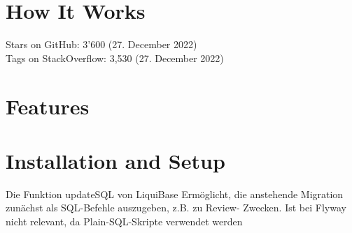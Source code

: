 \section{How It Works}

%
Stars on GitHub: 3'600 (27. December 2022)\\
Tags on StackOverflow: 3,530 (27. December 2022)\\

\section{Features}



\section{Installation and Setup}
Die Funktion updateSQL von LiquiBase
Ermöglicht, die anstehende Migration zunächst als SQL-Befehle auszugeben, z.B. zu Review- Zwecken.
Ist bei Flyway nicht relevant, da Plain-SQL-Skripte verwendet werden


\newpage